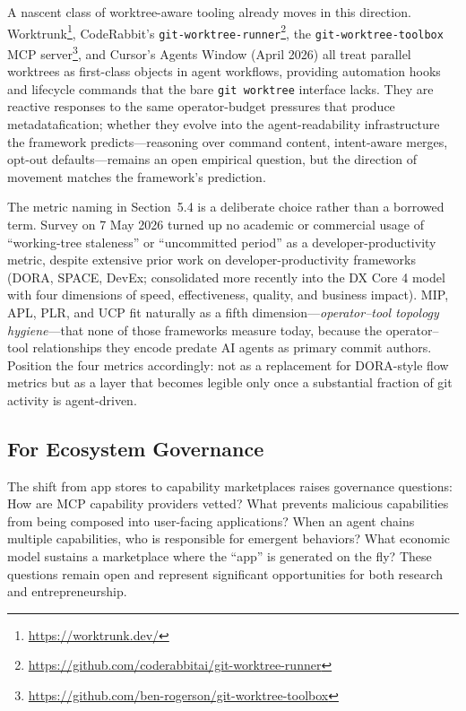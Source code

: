 \documentclass[sigconf, nonacm, anonymous=false]{acmart}
\begin{document}
A nascent class of worktree-aware tooling already moves in this direction. Worktrunk\footnote{\url{https://worktrunk.dev/}}, CodeRabbit's \texttt{git-worktree-runner}\footnote{\url{https://github.com/coderabbitai/git-worktree-runner}}, the \texttt{git-worktree-toolbox} MCP server\footnote{\url{https://github.com/ben-rogerson/git-worktree-toolbox}}, and Cursor's Agents Window (April 2026) all treat parallel worktrees as first-class objects in agent workflows, providing automation hooks and lifecycle commands that the bare \texttt{git worktree} interface lacks. They are reactive responses to the same operator-budget pressures that produce metadatafication; whether they evolve into the agent-readability infrastructure the framework predicts---reasoning over command content, intent-aware merges, opt-out defaults---remains an open empirical question, but the direction of movement matches the framework's prediction.

The metric naming in Section~5.4 is a deliberate choice rather than a borrowed term. Survey on 7 May 2026 turned up no academic or commercial usage of ``working-tree staleness'' or ``uncommitted period'' as a developer-productivity metric, despite extensive prior work on developer-productivity frameworks (DORA, SPACE, DevEx; consolidated more recently into the DX Core 4 model with four dimensions of speed, effectiveness, quality, and business impact). MIP, APL, PLR, and UCP fit naturally as a fifth dimension---\textit{operator--tool topology hygiene}---that none of those frameworks measure today, because the operator--tool relationships they encode predate AI agents as primary commit authors. Position the four metrics accordingly: not as a replacement for DORA-style flow metrics but as a layer that becomes legible only once a substantial fraction of git activity is agent-driven.

\subsection{For Ecosystem Governance}

The shift from app stores to capability marketplaces raises governance questions: How are MCP capability providers vetted? What prevents malicious capabilities from being composed into user-facing applications? When an agent chains multiple capabilities, who is responsible for emergent behaviors? What economic model sustains a marketplace where the ``app'' is generated on the fly? These questions remain open and represent significant opportunities for both research and entrepreneurship.
\end{document}
